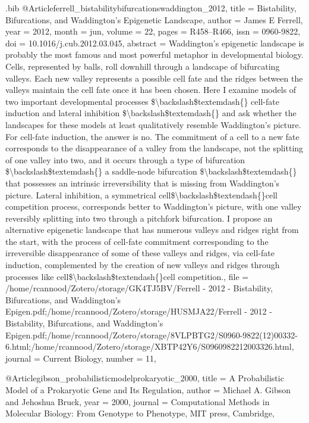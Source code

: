 \documentclass[
  table,
  10pt,
  a4paper]{article}
\begin{document}
\begin{filecontents}{\jobname.bib}
@Article{ferrell_bistabilitybifurcationswaddington_2012,
	title = {Bistability, {{Bifurcations}}, and {{Waddington}}'s {{Epigenetic Landscape}}},
	author = {James E Ferrell},
	year = {2012},
	month = {jun},
	volume = {22},
	pages = {R458--R466},
	issn = {0960-9822},
	doi = {10.1016/j.cub.2012.03.045},
	abstract = {Waddington's epigenetic landscape is probably the most famous and most powerful metaphor in developmental biology. Cells, represented by balls, roll downhill through a landscape of bifurcating valleys. Each new valley represents a possible cell fate and the ridges between the valleys maintain the cell fate once it has been chosen. Here I examine models of two important developmental processes \$\textbackslash backslash\$textemdash\{\} cell-fate induction and lateral inhibition \$\textbackslash backslash\$textemdash\{\} and ask whether the landscapes for these models at least qualitatively resemble Waddington's picture. For cell-fate induction, the answer is no. The commitment of a cell to a new fate corresponds to the disappearance of a valley from the landscape, not the splitting of one valley into two, and it occurs through a type of bifurcation \$\textbackslash backslash\$textemdash\{\} a saddle-node bifurcation \$\textbackslash backslash\$textemdash\{\} that possesses an intrinsic irreversibility that is missing from Waddington's picture. Lateral inhibition, a symmetrical cell\$\textbackslash backslash\$textendash\{\}cell competition process, corresponds better to Waddington's picture, with one valley reversibly splitting into two through a pitchfork bifurcation. I propose an alternative epigenetic landscape that has numerous valleys and ridges right from the start, with the process of cell-fate commitment corresponding to the irreversible disappearance of some of these valleys and ridges, via cell-fate induction, complemented by the creation of new valleys and ridges through processes like cell\$\textbackslash backslash\$textendash\{\}cell competition.},
	file = {/home/rcannood/Zotero/storage/GK4TJ5BV/Ferrell - 2012 - Bistability, Bifurcations, and Waddington's Epigen.pdf;/home/rcannood/Zotero/storage/HUSMJA22/Ferrell - 2012 - Bistability, Bifurcations, and Waddington's Epigen.pdf;/home/rcannood/Zotero/storage/8VLPBTG2/S0960-9822(12)00332-6.html;/home/rcannood/Zotero/storage/XBTP42Y6/S0960982212003326.html},
	journal = {Current Biology},
	number = {11},
}

@Article{gibson_probabilisticmodelprokaryotic_2000,
	title = {A Probabilistic Model of a Prokaryotic Gene and Its Regulation},
	author = {Michael A. Gibson and Jehoshua Bruck},
	year = {2000},
	journal = {Computational Methods in Molecular Biology: From Genotype to Phenotype, MIT press, Cambridge},
}


\end{filecontents}
\end{document}
